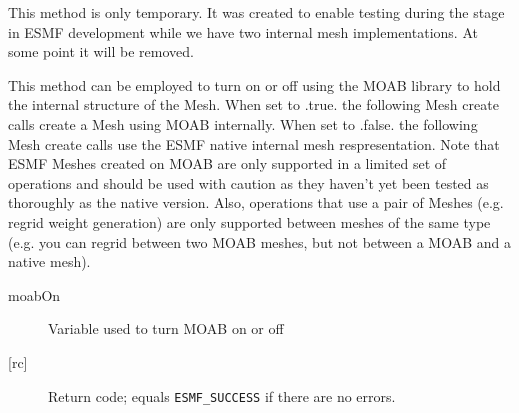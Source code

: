      This method is only temporary. It was created to enable testing during the stage in ESMF development while
     we have two internal mesh implementations. At some point it will be removed.
  
     This method can be employed to turn on or off using the MOAB library
     to hold the internal structure of the Mesh. When set to .true. the following
     Mesh create calls create a Mesh using MOAB internally. When set to .false. the following
     Mesh create calls use the ESMF native internal mesh respresentation. Note that ESMF Meshes
     created on MOAB are only supported in a limited set of operations and should be used
     with caution as they haven't yet been tested as thoroughly as the native version.
     Also, operations that use a pair of Meshes (e.g. regrid weight generation) are only supported between
     meshes of the same type (e.g. you can regrid between two MOAB meshes, but not between a MOAB and
     a native mesh).
  
     \begin{description}
     \item [moabOn]
           Variable used to turn MOAB on or off
     \item [{[rc]}]
           Return code; equals {\tt ESMF\_SUCCESS} if there are no errors.
     \end{description}
  
\setlength{\parskip}{\oldparskip}
\setlength{\parindent}{\oldparindent}
\setlength{\baselineskip}{\oldbaselineskip}

